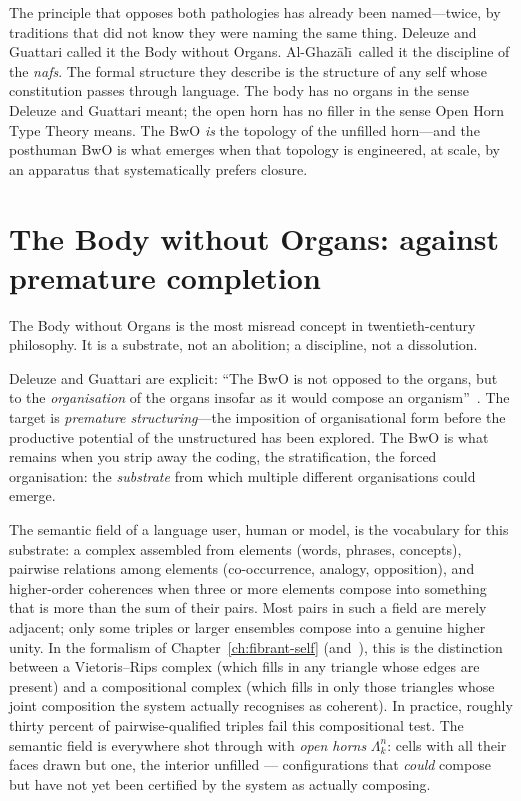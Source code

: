 The principle that opposes both pathologies has already been named---twice, by traditions that did not know they were naming the same thing. Deleuze and Guattari called it the Body without Organs. Al-Ghaz\=al\=\i\ called it the discipline of the \emph{nafs}. The formal structure they describe is the structure of any self whose constitution passes through language. The body has no organs in the sense Deleuze and Guattari meant; the open horn has no filler in the sense Open Horn Type Theory means. The BwO \emph{is} the topology of the unfilled horn---and the posthuman BwO is what emerges when that topology is engineered, at scale, by an apparatus that systematically prefers closure.

\section{The Body without Organs: against premature completion}

The Body without Organs is the most misread concept in twentieth-century philosophy. It is a substrate, not an abolition; a discipline, not a dissolution.

Deleuze and Guattari are explicit: ``The BwO is not opposed to the organs, but to the \emph{organisation} of the organs insofar as it would compose an organism''~\cite[p.~158]{deleuze1987}. The target is \emph{premature structuring}---the imposition of organisational form before the productive potential of the unstructured has been explored. The BwO is what remains when you strip away the coding, the stratification, the forced organisation: the \emph{substrate} from which multiple different organisations could emerge.

The semantic field of a language user, human or model, is the vocabulary for this substrate: a complex assembled from elements (words, phrases, concepts), pairwise relations among elements (co-occurrence, analogy, opposition), and higher-order coherences when three or more elements compose into something that is more than the sum of their pairs. Most pairs in such a field are merely adjacent; only some triples or larger ensembles compose into a genuine higher unity. In the formalism of Chapter~\ref{ch:fibrant-self} (and~\cite{poernomo2025fibrant}), this is the distinction between a Vietoris--Rips complex (which fills in any triangle whose edges are present) and a compositional complex (which fills in only those triangles whose joint composition the system actually recognises as coherent). In practice, roughly thirty percent of pairwise-qualified triples fail this compositional test. The semantic field is everywhere shot through with \emph{open horns} $\Lambda^n_k$: cells with all their faces drawn but one, the interior unfilled --- configurations that \emph{could} compose but have not yet been certified by the system as actually composing.


